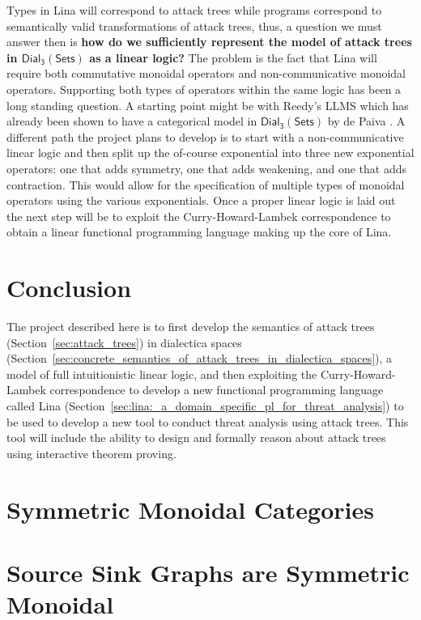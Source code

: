 \documentclass{llncs}
\newcommand{\dial}[0]{\mathsf{Dial_3}(\mathsf{Sets})}
\begin{document}
Types in Lina will correspond to attack trees while programs
correspond to semantically valid transformations of attack trees,
thus, a question we must answer then is \textbf{how do we sufficiently
  represent the model of attack trees in $\dial$ as a linear logic?}
The problem is the fact that Lina will require both commutative
monoidal operators and non-communicative monoidal
operators. Supporting both types of operators within the same logic
has been a long standing question.  A starting point might be with
Reedy's LLMS which has already been shown to have a categorical model
in $\dial$ by de Paiva \cite{dePaiva:2014a}.  A different path the
project plans to develop is to start with a non-communicative linear
logic and then split up the of-course exponential into three new
exponential operators: one that adds symmetry, one that adds
weakening, and one that adds contraction.  This would allow for the
specification of multiple types of monoidal operators using the
various exponentials.  Once a proper linear logic is laid out the next
step will be to exploit the Curry-Howard-Lambek correspondence to
obtain a linear functional programming language making up the core of
Lina.

\section{Conclusion}
\label{sec:conclusion}

The project described here is to first develop the semantics of attack
trees (Section~\ref{sec:attack_trees}) in dialectica spaces
(Section~\ref{sec:concrete_semantics_of_attack_trees_in_dialectica_spaces}),
a model of full intuitionistic linear logic, and then exploiting the
Curry-Howard-Lambek correspondence to develop a new functional
programming language called Lina
(Section~\ref{sec:lina:_a_domain_specific_pl_for_threat_analysis}) to
be used to develop a new tool to conduct threat analysis using attack
trees.  This tool will include the ability to design and formally
reason about attack trees using interactive theorem proving.


 

\appendix

\section{Symmetric Monoidal Categories}
\label{sec:symmetric_monoidal_categories}


\section{Source Sink Graphs are Symmetric Monoidal}
\label{sec:source_sink_graphs_are_symmetric_monoidal}

\end{document}
